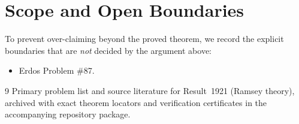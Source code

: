 \documentclass[10pt,reqno]{amsart}
\theoremstyle{definition}
\begin{document}
\section{Scope and Open Boundaries}

To prevent over-claiming beyond the proved theorem, we record the explicit boundaries that are \emph{not} decided by the argument above:
\begin{itemize}
  \item Erdos Problem \#87.
\end{itemize}

\begin{thebibliography}{9}
Primary problem list and source literature for Result~1921 (Ramsey theory), archived with exact theorem locators and verification certificates in the accompanying repository package.
\end{thebibliography}
\end{document}

